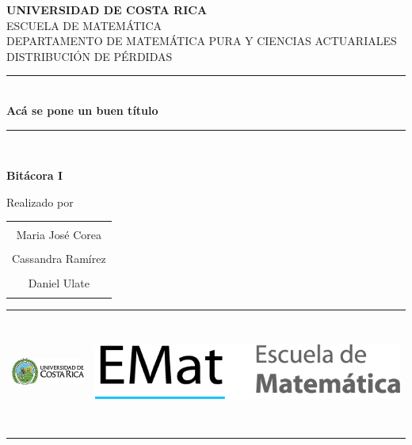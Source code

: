 \documentclass[
  oneside]{memoir}
\author{}
\date{\vspace{-2.5em}}
\newcommand{\TituloProy}{Ac\'a se pone un buen t\'itulo}  %
\newcommand{\EstudianteUno}{Maria Jos\'e Corea}
\newcommand{\EstudianteDos}{Cassandra Ram\'irez}
\newcommand{\EstudianteTres}{Daniel Ulate}
\begin{document}
\frontmatter

\begin{titlingpage}
  \newcommand{\HRule}{\rule{\linewidth}{0.5mm}} %

  \begin{center}

    {\Huge \textbf{UNIVERSIDAD DE COSTA RICA}}\\[0.2cm] 
    {\Large ESCUELA DE MATEM\'ATICA\\[0.2cm]
DEPARTAMENTO DE MATEMÁTICA PURA Y CIENCIAS ACTUARIALES\\[0.2cm] 
DISTRIBUCI\'ON DE P\'ERDIDAS\\[0cm]
} %

   

    \HRule \\[0.6cm]
    \Large \textbf{\TituloProy}
    \HRule \\[0.6cm]

    \vfill
      
    {\Large{\textbf{Bit\'acora I}}}
   
    \vfill
    \begin{center}
      Realizado por %
      \linebreak %
      \linebreak %
      \begin{tabular}{c}
        \hline  \\
        \EstudianteUno  \\ \\
        \EstudianteDos  \\ \\
        \EstudianteTres  \\ \\
        \hline 
      \end{tabular}
    \end{center}

    \vfill
    

    

    \begin{center}
    \begin{tabular}{l @{\hskip 2in} r}
    \includegraphics[height=2cm]{./images/ucr_marca_de_agua}
  & \includegraphics[height=4cm]{./images/EMat_escuela_matematica_horizontal_1} 
    \end{tabular}
    \end{center}


\end{center}
\end{titlingpage}
\end{document}
